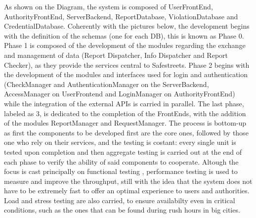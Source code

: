 As shown on the Diagram, the system is composed of UserFrontEnd, 
AuthorityFrontEnd, ServerBackend, ReportDatabase, ViolationDatabase and 
CredentialDatabase.
Coherently with the pictures below, the development begins with the
definition of the schemas (one for each DB), this is known as 
Phase 0.
Phase 1 is composed of the development of the modules regarding the
exchange and management of data (Report Dispatcher, Info Dispatcher 
and Report Checker), as they provide the services central to Safestreets.
Phase 2 begins with the development of the modules and interfaces used 
for login and authentication (CheckManager and AuthenticationManager 
on the ServerBackend, AccessManager on UserFrontend and LoginManager on
AuthorityFrontEnd) while the integration of the external APIs is carried 
in parallel.
The last phase, labeled as 3, is dedicated to the completion of the 
FrontEnds, with the addition of the modules ReportManager and RequestManager.
The process is bottom-up as first the components to be developed 
first are the core ones, followed by those one who rely on their services,
and the testing is costant: every single unit is tested upon completion 
and then aggregate testing is carried out at the end of each phase to 
verify the ability of said components to cooperate.
Altough the focus is cast principally on functional testing , 
performance testing is used to measure and improve the throughput, still 
with the idea that the system does not have to be extremely fast to 
offer an optimal experience to users and authorities. Load and stress testing 
are also carried, to ensure availabilty even in critical conditions, 
such as the ones that can be found during rush hours in big cities.


